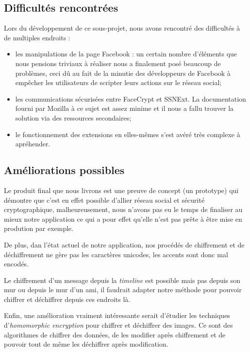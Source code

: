 \documentclass[a4paper,11pt,french]{article}
\begin{document}
\subsection{Difficultés rencontrées}
Lors du développement de ce sous-projet, nous avons rencontré des difficultés
à de multiples endroits :
\begin{itemize}
    \item les manipulations de la page Facebook : un certain nombre d'éléments 
    que nous pensions triviaux à réaliser nous a finalement posé beaucoup de 
    problèmes, ceci dû au fait de la minutie des développeurs de Facebook à
    empêcher les utilisateurs de \og{}scripter \fg{} leurs actions sur le réseau
    social;
    \item les communications sécurisées entre FaceCrypt et SSNExt. La documentation
	fourni par Mozilla à ce sujet est assez minime et il nous a fallu trouver 
	la solution via des ressources secondaires;
    \item le fonctionnement des extensions en elles-mêmes s'est avéré très
    complexe à apréhender.
\end{itemize}

\subsection{Améliorations possibles}
Le produit final que nous livrons est une preuve de concept (un prototype)
qui démontre que c'est en effet possible d'allier réseau social et 
sécurité cryptographique, malheureusement, nous n'avons pas eu le temps de 
finaliser au mieux notre application ce qui a pour effet qu'elle n'est pas 
prête à être \og mise en prodution \fg{} par exemple. 

De plus, dan l'état actuel de notre application, nos procédés de 
chiffrement et de déchiffrement ne gère pas les caractères unicodes, 
les accents sont donc mal encodés.

Le chiffrement d'un message depuis la \emph{timeline} est possible mais
pas depuis son mur ou depuis le mur d'un ami, il faudrait adapter notre 
méthode pour pouvoir chiffrer et déchiffrer depuis ces endroits là.

Enfin, une amélioration vraiment intéressante serait d'étudier les techniques
d'\emph{homomorphic encryption} pour chiffrer et déchiffrer des images. Ce
sont des algorithmes de chiffrer des données, de les modifier après chiffrement
et de pouvoir tout de même les déchiffrer après modification.

\clearpage
\end{document}
